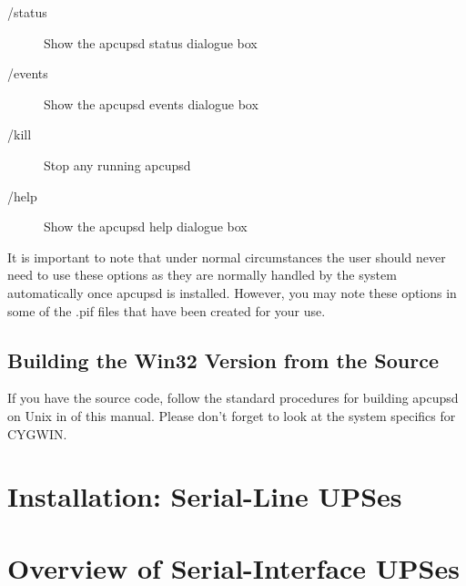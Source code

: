{{{{{{{{{{\begin{description}
\item [/status]
   Show the apcupsd status dialogue box  

\item [/events]
   Show the apcupsd events dialogue box  

\item [/kill]
   Stop any running apcupsd  

\item [/help]
   Show the apcupsd help dialogue box 
\end{description}

It is important to note that under normal circumstances the user should never
need to use these options as they are normally handled by the system
automatically once apcupsd is installed. However, you may note these options
in some of the .pif files that have been created for your use. 

\label{Building-the-Win32-Version-from-the-Source}

\subsection*{Building the Win32 Version from the Source}

\label{index-Windows_002c-Building-187}
\label{index-Building_002c-Windows-188}
If you have the source code, follow the standard procedures for building
apcupsd on Unix in 
 of this manual. Please
don't forget to look at the system specifics for CYGWIN. 

\label{Installation-on-Serial_002dLine-UPSes}

\section*{Installation: Serial-Line UPSes}

\label{Overview-of-Serial_002dInterface-UPSes}

\section*{Overview of Serial-Interface UPSes}

}}}}}}}}}}
